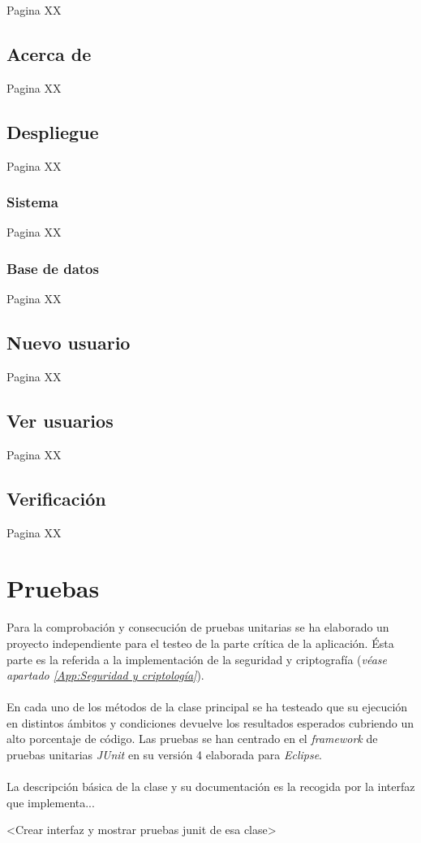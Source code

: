 \documentclass[../PFC.tex]{subfiles}
\begin{document}
Pagina XX

\subsection{Acerca de}
\label{App:AD:Acerca de}

Pagina XX


\subsection{Despliegue}
\label{App:AD:Despliegue}

Pagina XX

\subsubsection{Sistema}
\label{App:AD:D:Sistema}

Pagina XX

\subsubsection{Base de datos}
\label{App:AD:D:Base de dtaos}

Pagina XX

\subsection{Nuevo usuario}
\label{App:AD:Nuevo usuario}

Pagina XX

\subsection{Ver usuarios}
\label{App:AD:Ver usuarios}

Pagina XX

\subsection{Verificación}
\label{App:Verificacion}

Pagina XX


\section{Pruebas}
\label{App:Pruebas}

Para la comprobación y consecución de pruebas unitarias se ha elaborado un proyecto independiente para el testeo de la parte crítica de la aplicación. Ésta parte es la referida a la implementación de la seguridad y criptografía (\textit{véase apartado \ref{App:Seguridad y criptología}}).
\\\\
En cada uno de los métodos de la clase principal se ha testeado que su ejecución en distintos ámbitos y condiciones devuelve los resultados esperados cubriendo un alto porcentaje de código. Las pruebas se han centrado en el \textit{framework} de pruebas unitarias \textit{JUnit}\cite{junit} en su versión 4 elaborada para \textit{Eclipse}\cite{eclipse}.
\\\\
La descripción básica de la clase y su documentación es la recogida por la interfaz que implementa...

<Crear interfaz y mostrar pruebas junit de esa clase>
\end{document}
